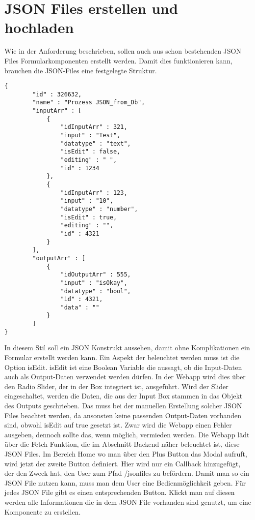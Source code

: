 \documentclass[a4paper,11pt]{scrreprt}
\begin{document}
\section{JSON Files erstellen und hochladen}
Wie in der Anforderung beschrieben, sollen auch aus schon bestehenden JSON Files Formularkomponenten erstellt werden. Damit dies funktionieren kann, brauchen die JSON-Files eine festgelegte Struktur. 
\hfill \break
\hfill \break
\hfill \break
\hfill \break
\begin{lstlisting}
{
        "id" : 326632,
        "name" : "Prozess JSON_from_Db",
        "inputArr" : [
            {
                "idInputArr" : 321,
                "input" : "Test",
                "datatype" : "text",
                "isEdit" : false,
                "editing" : " ",
                "id" : 1234
            },
            {
                "idInputArr" : 123,
                "input" : "10",
                "datatype" : "number",
                "isEdit" : true,
                "editing" : "",
                "id" : 4321
            }
        ],
        "outputArr" : [
            {
                "idOutputArr" : 555,
                "input" : "isOkay",
                "datatype" : "bool",
                "id" : 4321,
                "data" : ""
            }
        ]
}
\end{lstlisting}
In diesem Stil soll ein JSON Konstrukt aussehen, damit ohne Komplikationen ein Formular erstellt werden kann. Ein Aspekt der beleuchtet werden muss ist die Option isEdit. isEdit ist eine Boolean Variable die aussagt, ob die Input-Daten auch als Output-Daten verwendet werden dürfen. In der Webapp wird dies über den Radio Slider, der in der Box integriert ist, ausgeführt. Wird der Slider eingeschaltet, werden die Daten, die aus der Input Box stammen in das Objekt des Outputs geschrieben. Das muss bei der manuellen Erstellung solcher JSON Files beachtet werden, da ansonsten keine passenden Output-Daten vorhanden sind, obwohl isEdit auf true gesetzt ist. Zwar wird die Webapp einen Fehler ausgeben, dennoch sollte das, wenn möglich, vermieden werden. 
\hfill \break
\hfill \break
\hfill \break
\hfill \break
Die Webapp lädt über die Fetch Funktion, die im Abschnitt Backend näher beleuchtet ist, diese JSON Files. Im Bereich Home wo man über den Plus Button das Modal aufruft, wird jetzt der zweite Button definiert. Hier wird nur ein Callback hinzugefügt, der den Zweck hat, den User zum Pfad /jsonfiles zu befördern. 
Damit man so ein JSON File nutzen kann, muss man dem User eine Bedienmöglichkeit geben. Für jedes JSON File gibt es einen entsprechenden Button. Klickt man auf diesen werden alle Informationen die in dem JSON File vorhanden sind genutzt, um eine Komponente zu erstellen.
\end{document}
